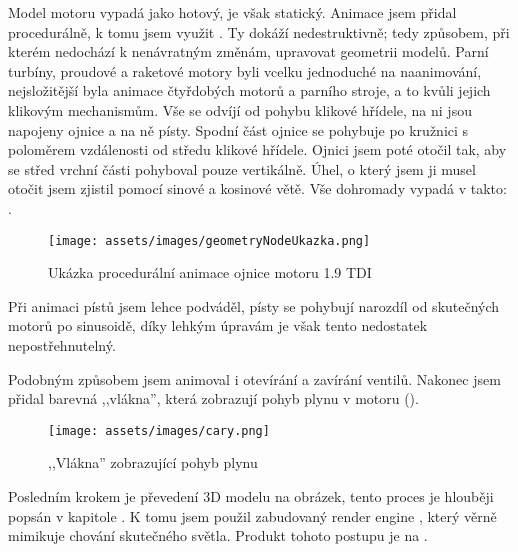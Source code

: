 {Model motoru vypadá jako hotový, je však statický. Animace jsem přidal procedurálně, k tomu jsem využit . Ty dokáží nedestruktivně; tedy způsobem, při kterém nedochází k nenávratným změnám, upravovat geometrii modelů. Parní turbíny, proudové a raketové motory byli vcelku jednoduché na naanimování, nejsložitější byla animace čtyřdobých motorů a parního stroje, a to kvůli jejich klikovým mechanismům.}\odst
{Vše se odvíjí od pohybu klikové hřídele, na ni jsou napojeny ojnice a na ně písty. Spodní část ojnice se pohybuje po kružnici s poloměrem vzdálenosti od středu klikové hřídele. Ojnici jsem poté otočil tak, aby se střed vrchní části pohyboval pouze vertikálně. Úhel, o který jsem ji musel otočit jsem zjistil pomocí sinové a kosinové větě. Vše dohromady vypadá v  takto: .}

\begin{figure}[H]
    \centering
    \texttt{[image: assets/images/geometryNodeUkazka.png]}
    \caption{Ukázka procedurální animace ojnice motoru 1.9 TDI \jaObr}
    \label{obr:geometryNodeUkazka}
\end{figure}

{Při animaci pístů jsem lehce podváděl, písty se pohybují narozdíl od skutečných motorů po sinusoidě, díky lehkým úpravám je však tento nedostatek nepostřehnutelný.}

\newpage

{Podobným způsobem jsem animoval i otevírání a zavírání ventilů. Nakonec jsem přidal barevná ,,vlákna'', která zobrazují pohyb plynu v motoru ().}

\begin{figure}[H]
    \centering
    \texttt{[image: assets/images/cary.png]}
    \caption{,,Vlákna'' zobrazující pohyb plynu \jaObr}
    \label{obr:1.9TDICary}
\end{figure}

{Posledním krokem je převedení 3D modelu na obrázek, tento proces je hlouběji popsán v kapitole . K tomu jsem použil zabudovaný render engine , který věrně mimikuje chování skutečného světla. Produkt tohoto postupu je na .}

